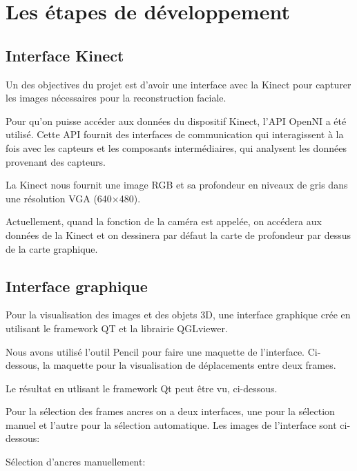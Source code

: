 \documentclass[a4paper,11pt]{article}
\begin{document}
\section{Les étapes de développement}
\subsection*{Interface Kinect}

Un des objectives du projet est d’avoir une interface avec la Kinect pour capturer les images nécessaires pour la reconstruction faciale.

Pour qu’on puisse accéder aux données du dispositif Kinect, l’API OpenNI a été utilisé. Cette API fournit des interfaces de communication qui interagissent à la fois avec les capteurs et les composants intermédiaires, qui analysent les données provenant des capteurs.

La Kinect nous fournit une image RGB et sa profondeur en niveaux de gris dans une résolution VGA (640×480).

Actuellement, quand la fonction de la caméra est appelée, on accédera aux données de la Kinect et on dessinera par défaut la carte de profondeur par dessus de la carte graphique. 





\subsection*{Interface graphique}

Pour la visualisation des images et des objets 3D, une interface graphique crée en utilisant le framework QT et la librairie QGLviewer. 

Nous avons utilisé l’outil Pencil pour faire une maquette de l’interface. Ci-dessous, la maquette pour la visualisation de déplacements entre deux frames.

Le résultat en utlisant le framework Qt peut être vu, ci-dessous.

Pour la sélection des  frames ancres on a deux interfaces, une pour la sélection manuel et l’autre pour la sélection automatique. Les images de l’interface sont ci-dessous:

Sélection d'ancres manuellement: 
\end{document}

